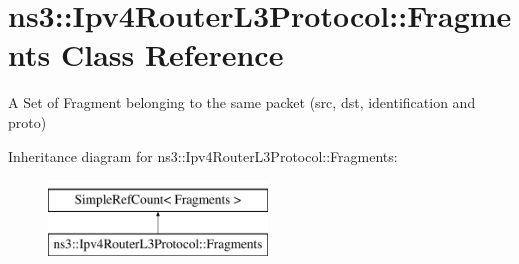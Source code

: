 \hypertarget{classns3_1_1Ipv4RouterL3Protocol_1_1Fragments}{\section{ns3\-:\-:Ipv4\-Router\-L3\-Protocol\-:\-:Fragments Class Reference}
\label{classns3_1_1Ipv4RouterL3Protocol_1_1Fragments}
}


A Set of Fragment belonging to the same packet (src, dst, identification and proto)  


Inheritance diagram for ns3\-:\-:Ipv4\-Router\-L3\-Protocol\-:\-:Fragments\-:\begin{figure}[H]
\begin{center}
\leavevmode
\includegraphics[height=2.000000cm]{classns3_1_1Ipv4RouterL3Protocol_1_1Fragments}
\end{center}
\end{figure}

